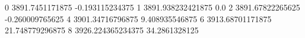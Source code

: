 0 3891.7451171875 -0.193115234375
1 3891.938232421875 0.0
2 3891.67822265625 -0.260009765625
4 3901.34716796875 9.408935546875
6 3913.68701171875 21.748779296875
8 3926.224365234375 34.2861328125
